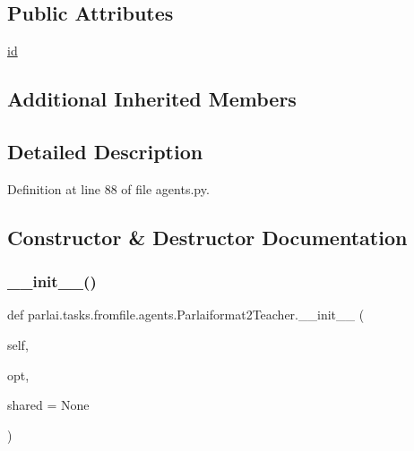 \subsection*{Public Attributes}
\begin{DoxyCompactItemize}
\item 
\hyperlink{classparlai_1_1tasks_1_1fromfile_1_1agents_1_1Parlaiformat2Teacher_aeea3091d7296c9abc5376a3b920a31b8}{id}
\end{DoxyCompactItemize}
\subsection*{Additional Inherited Members}


\subsection{Detailed Description}


Definition at line 88 of file agents.\+py.



\subsection{Constructor \& Destructor Documentation}
\mbox{\label{classparlai_1_1tasks_1_1fromfile_1_1agents_1_1Parlaiformat2Teacher_a18904cf2f5851ea2f1ee37136a0efb2b}} 
\subsubsection{\texorpdfstring{\+\_\+\+\_\+init\+\_\+\+\_\+()}{\_\_init\_\_()}}
{\footnotesize\ttfamily def parlai.\+tasks.\+fromfile.\+agents.\+Parlaiformat2\+Teacher.\+\_\+\+\_\+init\+\_\+\+\_\+ (\begin{DoxyParamCaption}\item[{}]{self,  }\item[{}]{opt,  }\item[{}]{shared = {\ttfamily None} }\end{DoxyParamCaption})}



